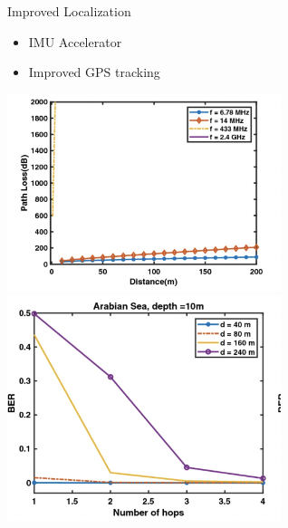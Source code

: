 \begin{frame}{Improved Localization }
    \begin{itemize}
        \item IMU Accelerator
        \item Improved GPS tracking
    \end{itemize}   
    \includegraphics[height=0.6\textheight, width=0.6\textwidth, keepaspectratio]{images/path-loss.png}
    \includegraphics[height=0.6\textheight, width=0.6\textwidth, keepaspectratio]{images/multihop-biterror.png}
\end{frame}



